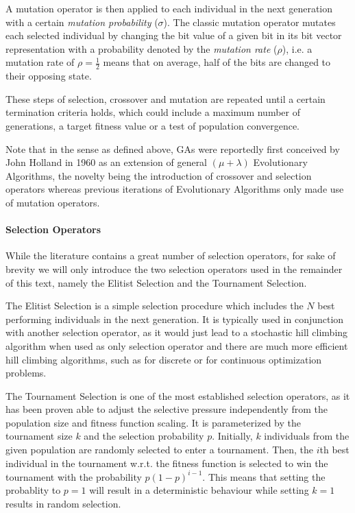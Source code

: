 A mutation operator is then applied to each individual in the next generation with a certain \emph{mutation probability} ($\sigma$).
The classic mutation operator mutates each selected individual by changing the bit value of a given bit in its bit vector representation with a probability denoted by the \emph{mutation rate} ($\rho$), i.e. a mutation rate of $\rho=\frac{1}{2}$ means that on average, half of the bits are changed to their opposing state.

These steps of selection, crossover and mutation are repeated until a certain termination criteria holds, which could include a maximum number of generations, a target fitness value or a test of population convergence.

Note that in the sense as defined above, \aclp{GA} were reportedly\cite{mitchell:1998a} first conceived by John Holland in 1960 as an extension of general $(\mu +\lambda)$ Evolutionary Algorithms, the novelty being the introduction of crossover and selection operators whereas previous iterations of Evolutionary Algorithms only made use of mutation operators.

\paragraph{Selection Operators}
While the literature contains a great number of selection operators, for sake of brevity we will only introduce the two selection operators used in the remainder of this text, namely the Elitist Selection\cite{mitchell:1998a} and the Tournament Selection\cite{miller:cs1995a}.


The Elitist Selection is a simple selection procedure which includes the $N$ best performing individuals in the next generation.
It is typically used in conjunction with another selection operator, as it would just lead to a stochastic hill climbing algorithm when used as only selection operator and there are much more efficient hill climbing algorithms, such as \cite{vaughan:ijc2005a} for discrete or \cite{altman:cm1970a} for continuous optimization problems.

The Tournament Selection is one of the most established selection operators, as it has been proven able to adjust the selective pressure independently from the population size and fitness function scaling\cite{goldberg:1990a}.
It is parameterized by the tournament size $k$ and the selection probability $p$.
Initially, $k$ individuals from the given population are randomly selected to enter a tournament.
Then, the $i$th best individual in the tournament w.r.t. the fitness function is selected to win the tournament with the probability $p(1-p)^{i-1}$.
This means that setting the probablity to $p=1$ will result in a deterministic behaviour while setting $k=1$ results in random selection.


